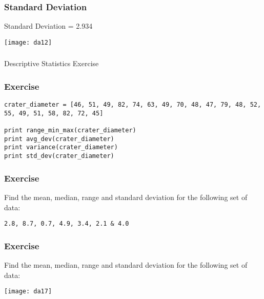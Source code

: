 
\begin{frame}[fragile]\frametitle{Standard Deviation}	
Standard Deviation = 2.934
\begin{center}
\texttt{[image: da12]}
\end{center}
\end{frame}

\begin{frame}[fragile]\frametitle{}
\begin{center}
{\Large Descriptive Statistics Exercise}
\end{center}
\end{frame}

\begin{frame}[fragile]\frametitle{Exercise}	



\begin{lstlisting}
crater_diameter = [46, 51, 49, 82, 74, 63, 49, 70, 48, 47, 79, 48, 52, 55, 49, 51, 58, 82, 72, 45]
 
print range_min_max(crater_diameter)
print avg_dev(crater_diameter)
print variance(crater_diameter)
print std_dev(crater_diameter)
\end{lstlisting}
\end{frame}


\begin{frame}[fragile]\frametitle{Exercise}	
Find the mean, median, range and standard deviation for the following set of data:

\lstinline|2.8, 8.7, 0.7, 4.9, 3.4, 2.1 & 4.0|
\end{frame}

\begin{frame}[fragile]\frametitle{Exercise}	
Find the mean, median, range and standard deviation for the following set of data:

\begin{center}
\texttt{[image: da17]}
\end{center}
\end{frame}

